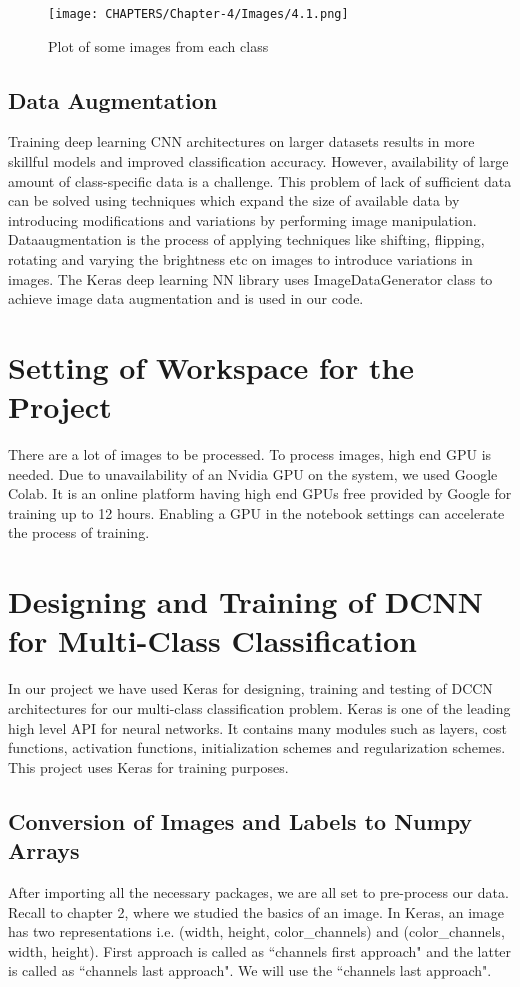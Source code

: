 \begin{figure}[H]
    \centering
    \captionsetup{justification = centering}
    \texttt{[image: CHAPTERS/Chapter-4/Images/4.1.png]}
    \caption{Plot of some images from each class} 
    \label{fig:4.1}
  \end{figure}

\subsection{Data Augmentation}
Training deep learning CNN architectures on larger datasets
results in more skillful models and improved classification accuracy.
However, availability of large amount of  class-specific data is a challenge.
This problem of lack of sufficient data can be solved using
techniques which expand the size of available data by introducing
modifications and variations by performing image manipulation.
Dataaugmentation is the process of applying techniques like shifting, 
flipping, rotating and varying the brightness etc on images to
introduce variations in images. The Keras deep learning NN library uses
ImageDataGenerator
class to achieve image data augmentation and is used in our code.

\section{Setting of Workspace for the Project}
There are a lot of images to be processed. To process images, high end GPU is
needed. Due to unavailability of an Nvidia GPU on the system, we used Google Colab.
It is an online platform having high end GPUs free provided by Google for training
up to 12 hours. Enabling a GPU in the notebook settings can accelerate the process of
training.
\section{Designing and Training of DCNN for Multi-Class Classification}
In our project we have used Keras for designing, training and testing of 
DCCN architectures for our multi-class classification problem.
Keras is one of the leading high level API for neural networks. It contains
many modules such as layers, cost functions, activation functions, initialization
schemes and regularization schemes. This project uses Keras for training purposes.
\subsection{Conversion of Images and Labels to Numpy Arrays}
After importing all the necessary packages, we are all set to pre-process our data.
Recall to chapter 2, where we studied the basics of an image. In Keras, an image has two
representations i.e. (width, height, color\_channels) and (color\_channels, width, height).
First approach is called as ``channels first approach" and
the latter is called as ``channels last approach".
We will use the ``channels last approach".

